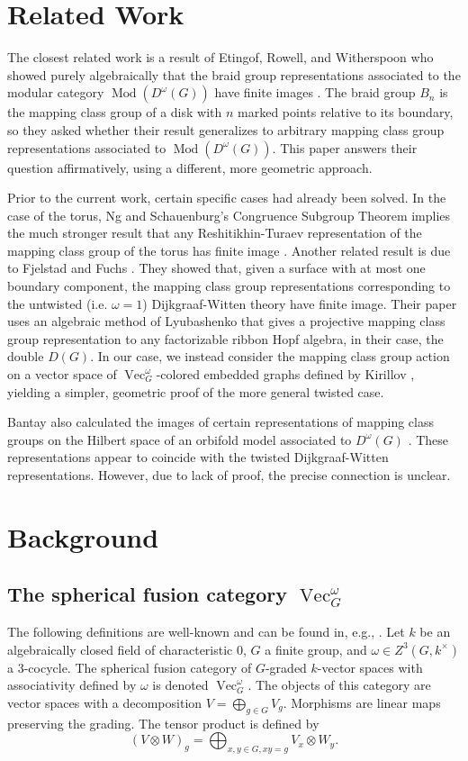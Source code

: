\documentclass{amsart}
\DeclareMathOperator{\Mod}{Mod}
\DeclareMathOperator{\Vect}{Vec}
\begin{document}
\section{Related Work}

The closest related work is a result of Etingof, Rowell, and Witherspoon who showed purely algebraically that the braid group representations associated to the modular category $\Mod(D^\omega(G))$ have finite images \cite{erw}.   The braid group $B_n$ is the mapping class group of a disk with $n$ marked points relative to its boundary, so they asked whether their result generalizes to arbitrary mapping class group representations associated to $\Mod(D^\omega(G))$. This paper answers their question affirmatively, using a different, more geometric approach.

Prior to the current work, certain specific cases had already been solved. In the case of the torus, Ng and Schauenburg's Congruence Subgroup Theorem implies the much stronger result that any Reshitikhin-Turaev representation of the mapping class group of the torus has finite image \cite{0806.2493}.   Another related result is due to Fjelstad and Fuchs \cite{fjfu}.  They showed that, given a surface with at most one boundary component, the mapping class group representations corresponding to the untwisted (i.e. $\omega = 1$) Dijkgraaf-Witten theory have finite image.  Their paper uses an algebraic method of Lyubashenko \cite{Lyubashenko1996} that gives a projective mapping class group representation to any factorizable ribbon Hopf algebra, in their case, the double $D(G)$. In our case, we instead consider the mapping class group action on a vector space of $\Vect_G^\omega$-colored embedded graphs defined by Kirillov \cite{kirillovStringNets}, yielding a simpler, geometric proof of the more general twisted case.

Bantay also calculated the images of certain representations of mapping class groups on the Hilbert space of an orbifold model associated to $D^\omega(G)$ \cite{bantay}.  These representations appear to coincide with the twisted Dijkgraaf-Witten representations. However, due to lack of proof, the precise connection is unclear. 


\section{Background}
\subsection{The spherical fusion category $\Vect_G^\omega$}
The following definitions are well-known and can be found in, e.g., \cite{etingofTensor}.  Let $k$ be an  algebraically closed field of characteristic 0,  $G$ a finite group, and $\omega \in Z^3(G, k^\times)$ a 3-cocycle.    The spherical fusion category of $G$-graded $k$-vector spaces with associativity defined by $\omega$ is denoted $\Vect_G^\omega$.  The objects of this category are vector spaces with a decomposition $V = \bigoplus_{g \in G} V_g$. Morphisms are linear maps preserving the grading. The tensor product is defined by
$$ (V \otimes W)_g = \bigoplus_{x,y \in G, xy = g} V_x \otimes W_y. $$
\end{document}
